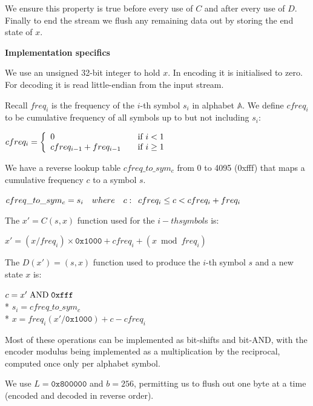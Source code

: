 \documentclass[a4paper]{article}
\begin{document}
We ensure this property is true before every use of $C$ and after every
use of $D$.  Finally to end the stream we flush any remaining data out
by storing the end state of $x$.


\textbf{Implementation specifics}

We use an unsigned 32-bit integer to hold $x$. In encoding it is
initialised to zero. For decoding it is read little-endian from the
input stream.

Recall $freq_{i}$ is the frequency of the $i$-th symbol $s_{i}$ in alphabet
$\mathbb{A}$.  We define $cfreq_i$ to be cumulative frequency of all symbols
up to but not including $s_{i}$:

{
\setlength{\parindent}{1cm}
$ cfreq_{i} = \left\{
\begin{array}{l l}
0 & \quad \textrm{if $i < 1$} \\
cfreq_{i-1} + freq_{i-1} & \quad \textrm{if $i \geq 1$}
\end{array}
\right. $
}


We have a reverse lookup table $cfreq\_to\_sym_c$ from 0 to 4095
(0xfff) that maps a cumulative frequency $c$ to a symbol $s$.

{
\setlength{\parindent}{1cm}
\indent   $cfreq\_to\_sym_c = s_{i} \quad where \quad c: \enskip cfreq_i \leq c <
cfreq_i + freq_i$
}


The $x' = C(s,x)$ function used for the ${i}-th symbol ${s} is:

{
\setlength{\parindent}{1cm}
\indent    $x' = (x/freq_i) \times \mathtt{0x1000} + cfreq_i + (x \bmod freq_i)$
}

The $D(x') = (s,x)$ function used to produce the $i$-th symbol $s$ and
a new state $x$ is:

{
\setlength{\parindent}{1cm}
\indent    $c = x' \bitand \mathtt{0xfff}$\\*
\indent    $s_{i} = cfreq\_to\_sym_{c}$\\*
\indent    $x = freq_{i} (x' / \mathtt{0x1000}) + c - cfreq_{i}$
}

Most of these operations can be implemented as bit-shifts and bit-AND,
with the encoder modulus being implemented as a multiplication by the
reciprocal, computed once only per alphabet symbol.

We use $L = \mathtt{0x800000}$ and $b = 256$, permitting us to flush out one byte
at a time (encoded and decoded in reverse order).
\end{document}
